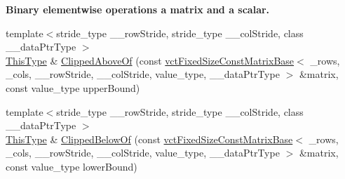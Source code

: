 \begin{Indent}{\bf Binary elementwise operations a matrix and a scalar.}
\begin{DoxyCompactItemize}
\item 
{\footnotesize template$<$stride\+\_\+type \+\_\+\+\_\+row\+Stride, stride\+\_\+type \+\_\+\+\_\+col\+Stride, class \+\_\+\+\_\+data\+Ptr\+Type $>$ }\\\hyperlink{classvct_fixed_size_const_matrix_base_a7ec66a96ed7e08ce9ff54093133c9d8d}{This\+Type} \& \hyperlink{classvct_fixed_size_matrix_base_aa4a2ea85e9cac6364666a0b7c05ef021}{Clipped\+Above\+Of} (const \hyperlink{classvct_fixed_size_const_matrix_base}{vct\+Fixed\+Size\+Const\+Matrix\+Base}$<$ \+\_\+rows, \+\_\+cols, \+\_\+\+\_\+row\+Stride, \+\_\+\+\_\+col\+Stride, value\+\_\+type, \+\_\+\+\_\+data\+Ptr\+Type $>$ \&matrix, const value\+\_\+type upper\+Bound)
\item 
{\footnotesize template$<$stride\+\_\+type \+\_\+\+\_\+row\+Stride, stride\+\_\+type \+\_\+\+\_\+col\+Stride, class \+\_\+\+\_\+data\+Ptr\+Type $>$ }\\\hyperlink{classvct_fixed_size_const_matrix_base_a7ec66a96ed7e08ce9ff54093133c9d8d}{This\+Type} \& \hyperlink{classvct_fixed_size_matrix_base_acc63e84cde34877936a832f705d5fa84}{Clipped\+Below\+Of} (const \hyperlink{classvct_fixed_size_const_matrix_base}{vct\+Fixed\+Size\+Const\+Matrix\+Base}$<$ \+\_\+rows, \+\_\+cols, \+\_\+\+\_\+row\+Stride, \+\_\+\+\_\+col\+Stride, value\+\_\+type, \+\_\+\+\_\+data\+Ptr\+Type $>$ \&matrix, const value\+\_\+type lower\+Bound)
\end{DoxyCompactItemize}
\end{Indent}
